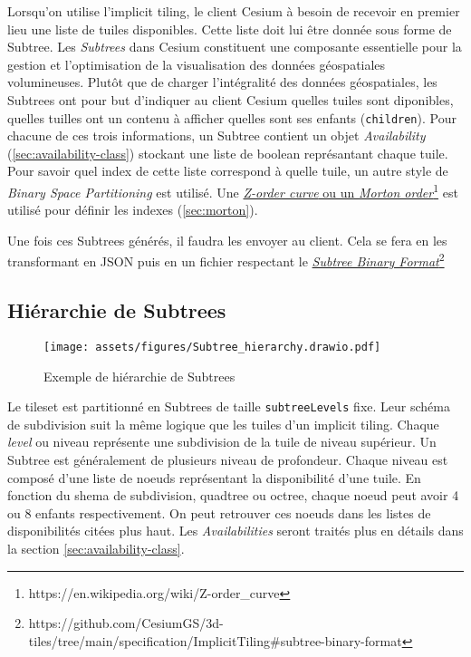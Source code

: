 Lorsqu'on utilise l'implicit tiling, le client Cesium à besoin de recevoir en premier lieu une liste de tuiles disponibles. Cette liste doit lui être donnée sous forme de Subtree. Les \textit{Subtrees} dans Cesium constituent une composante essentielle pour la gestion et l'optimisation de la visualisation des données géospatiales volumineuses. Plutôt que de charger l'intégralité des données géospatiales, les Subtrees ont pour but d'indiquer au client Cesium quelles tuiles sont diponibles, quelles tuilles ont un contenu à afficher quelles sont ses enfants (\texttt{children}). Pour chacune de ces trois informations, un Subtree contient un objet \textit{Availability} (\autoref{sec:availability-class}) stockant une liste de boolean représantant chaque tuile. Pour savoir quel index de cette liste correspond à quelle tuile, un autre style de \textit{Binary Space Partitioning} est utilisé. Une \href{https://en.wikipedia.org/wiki/Z-order\_curve}{\textit{Z-order curve} ou un \textit{Morton order}}\footnote{https://en.wikipedia.org/wiki/Z-order\_curve} est utilisé pour définir les indexes (\autoref{sec:morton}).

Une fois ces Subtrees générés, il faudra les envoyer au client. Cela se fera en les transformant en JSON puis en un fichier respectant le \href{https://github.com/CesiumGS/3d-tiles/tree/main/specification/ImplicitTiling\#subtree-binary-format}{\textit{Subtree Binary Format}}\footnote{https://github.com/CesiumGS/3d-tiles/tree/main/specification/ImplicitTiling\#subtree-binary-format}

\subsection*{Hiérarchie de Subtrees}

\begin{figure}[H]
    \centering
    \texttt{[image: assets/figures/Subtree\_hierarchy.drawio.pdf]}
    \caption{Exemple de hiérarchie de Subtrees}
    \label{fig:subtree-hierarchy}
\end{figure}

Le tileset est partitionné en Subtrees de taille \texttt{subtreeLevels} fixe. Leur schéma de subdivision suit la même logique que les tuiles d'un implicit tiling. Chaque \textit{level} ou niveau représente une subdivision de la tuile de niveau supérieur. Un Subtree est généralement de plusieurs niveau de profondeur. Chaque niveau est composé d'une liste de noeuds représentant la disponibilité d'une tuile. En fonction du shema de subdivision, quadtree ou octree, chaque noeud peut avoir 4 ou 8 enfants respectivement. On peut retrouver ces noeuds dans les listes de disponibilités citées plus haut. Les \textit{Availabilities} seront traités plus en détails dans la section \ref{sec:availability-class}.

